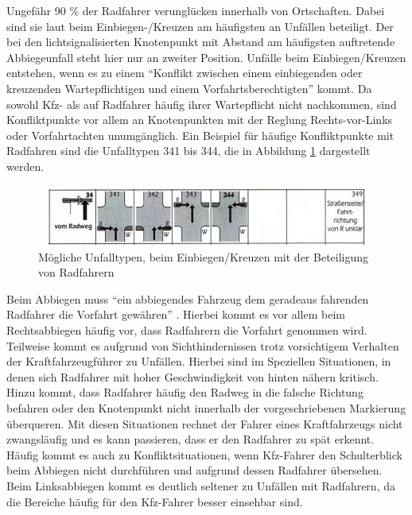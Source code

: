 Ungefähr 90 \% \parencite[S. 10]{Below.2016} der Radfahrer verunglücken innerhalb von Ortschaften. Dabei sind sie laut \Textcite[S. 303]{Schreiber.2014b} beim Einbiegen-/Kreuzen am häufigsten an Unfällen beteiligt. Der bei den lichtsignalisierten Knotenpunkt mit Abstand am häufigsten auftretende Abbiegeunfall steht hier nur an zweiter Position. Unfälle beim Einbiegen/Kreuzen entstehen, wenn es zu einem \enquote{Konflikt zwischen einem einbiegenden oder kreuzenden Wartepflichtigen und einem Vorfahrtsberechtigten} \parencite[S. 12]{GesamtverbandderDeutschenVersicherungswirtschafte.V..2016} kommt. Da sowohl \ac{Kfz}- als auf Radfahrer häufig ihrer Wartepflicht nicht nachkommen, sind Konfliktpunkte vor allem an Knotenpunkten mit der Reglung Rechts-vor-Links oder Vorfahrtachten unumgänglich. Ein Beispiel für häufige Konfliktpunkte mit Radfahren sind die Unfalltypen 341 bis 344, die in Abbildung \ref{fig:Einbiege-Unfall_Rad} dargestellt werden.

\begin{savenotes}
	\begin{figure}[H]
		\centering
		\includegraphics[width=13cm,height=2cm]{figures/Einbiege-Unfall_Rad}
		\caption[Unfalltyp 3 Einbiegen/Kreuzen-Unfall mit Radfahrerbeteiligung]{Mögliche Unfalltypen, beim Einbiegen/Kreuzen mit der Beteiligung von Radfahrern \parencite[S. 13]{GesamtverbandderDeutschenVersicherungswirtschafte.V..2016}}\label{fig:Einbiege-Unfall_Rad}
	\end{figure}
\end{savenotes}

Beim Abbiegen muss \enquote{ein abbiegendes Fahrzeug dem geradeaus fahrenden Radfahrer die Vorfahrt gewähren} \parencite[S. 303]{Schreiber.2014b}. Hierbei kommt es vor allem beim Rechtsabbiegen häufig vor, dass Radfahrern die Vorfahrt genommen wird. Teilweise kommt es aufgrund von Sichthindernissen trotz vorsichtigem Verhalten der Kraftfahrzeugführer zu Unfällen. Hierbei sind im Speziellen Situationen, in denen sich Radfahrer mit hoher Geschwindigkeit von hinten nähern kritisch. Hinzu kommt, dass Radfahrer häufig den Radweg in die falsche Richtung befahren oder den Knotenpunkt nicht innerhalb der vorgeschriebenen Markierung überqueren. Mit diesen Situationen rechnet der Fahrer eines Kraftfahrzeugs nicht zwangsläufig und es kann passieren, dass er den Radfahrer zu spät erkennt. Häufig kommt es auch zu Konfliktsituationen, wenn Kfz-Fahrer den Schulterblick beim Abbiegen nicht durchführen und aufgrund dessen Radfahrer übersehen. Beim Linksabbiegen kommt es deutlich seltener zu Unfällen mit Radfahrern, da die Bereiche häufig für den Kfz-Fahrer besser einsehbar sind. %

